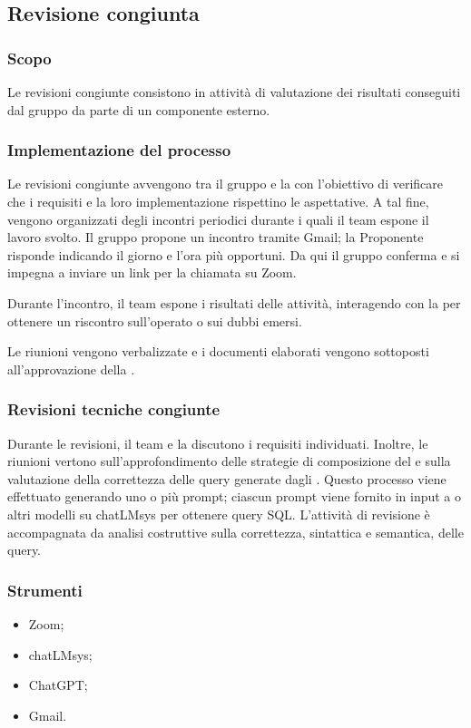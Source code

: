 \subsection{Revisione congiunta}\label{revisione_congiunta}

\subsubsection{Scopo}
\par Le revisioni congiunte consistono in attività di valutazione dei risultati conseguiti dal gruppo da parte di un componente esterno.

\subsubsection{Implementazione del processo}
\par Le revisioni congiunte avvengono tra il gruppo e la  con l'obiettivo di verificare che i requisiti e la loro implementazione rispettino le aspettative. A tal fine, vengono organizzati degli incontri periodici durante i quali il team espone il lavoro svolto. Il gruppo propone un incontro tramite Gmail; la Proponente risponde indicando il giorno e l'ora più opportuni. Da qui il gruppo conferma e si impegna a inviare un link per la chiamata su Zoom.
\par Durante l'incontro, il team espone i risultati delle attività, interagendo con la  per ottenere un riscontro sull'operato o sui dubbi emersi.
\par Le riunioni vengono verbalizzate e i documenti elaborati vengono sottoposti all'approvazione della .

\subsubsection{Revisioni tecniche congiunte}
\par Durante le revisioni, il team e la  discutono i requisiti individuati. Inoltre, le riunioni vertono sull'approfondimento delle strategie di composizione del  e sulla valutazione della correttezza delle query generate dagli . Questo processo viene effettuato generando uno o più prompt; ciascun prompt viene fornito in input a  o altri modelli su chatLMsys per ottenere query SQL. L'attività di revisione è accompagnata da analisi costruttive sulla correttezza, sintattica e semantica, delle query.

\subsubsection{Strumenti}
\IntroStrumenti
\begin{itemize}
    \item Zoom;
    \item chatLMsys;
    \item ChatGPT;
    \item Gmail.
\end{itemize}
